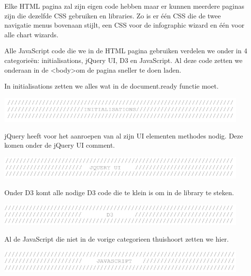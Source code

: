 Elke HTML pagina zal zijn eigen code hebben maar er kunnen meerdere paginas zijn die dezelfde CSS gebruiken en libraries. Zo is er \'{e}\'{e}n CSS die de twee navigatie menus bovenaan stijlt, een CSS voor de infographic wizard en \'{e}\'{e}n voor alle chart wizards. 

Alle JavaScript code die we in de HTML pagina gebruiken verdelen we onder in 4 categorie\"{e}n: initialisations, jQuery UI, D3  en JavaScript. Al deze code zetten we onderaan in de \textless body\textgreater  om de pagina sneller te doen laden.

In initialisations zetten we alles wat in de document.ready functie moet.

\begin{center}
  \includegraphics[width=0.95\textwidth]{figures/chap2/initialisations.png}
\end{center}

jQuery heeft voor het aanroepen van al zijn UI elementen methodes nodig. Deze komen onder de jQuery UI comment.

\begin{center}
  \includegraphics[width=0.95\textwidth]{figures/chap2/jqueryui.png}
\end{center}


Onder D3 komt alle nodige D3 code die te klein is om in de library te steken.

\begin{center}
  \includegraphics[width=0.95\textwidth]{figures/chap2/d3.png}
\end{center}

Al de JavaScript die niet in de vorige categorieen thuishoort zetten we hier.

\begin{center}
  \includegraphics[width=0.95\textwidth]{figures/chap2/javascript.png}
\end{center}

